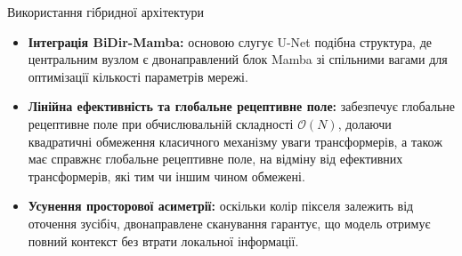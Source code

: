 \begin{frame}{Використання гібридної архітектури}
    \begin{itemize}
        \item<alert@1> \textbf{Інтеграція BiDir-Mamba:} основою слугує U-Net подібна структура, де центральним вузлом є двонаправлений блок Mamba зі спільними вагами для оптимізації кількості параметрів мережі.
        \item \textbf{Лінійна ефективність та глобальне рецептивне поле:} забезпечує глобальне рецептивне поле при обчислювальній складності $\mathcal{O}(N)$, долаючи квадратичні обмеження класичного механізму уваги трансформерів, а також має справжнє глобальне рецептивне поле, на відміну від ефективних трансформерів, які тим чи іншим чином обмежені.
        \item \textbf{Усунення просторової асиметрії:} оскільки колір пікселя залежить від оточення зусібіч, двонаправлене сканування гарантує, що модель отримує повний контекст без втрати локальної інформації.
    \end{itemize}
\end{frame}

